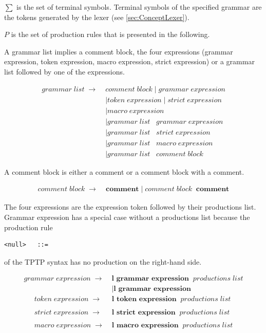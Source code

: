 $\sum$ is the set of terminal symbols. Terminal symbols of the specified grammar are the tokens generated by the lexer (see \ref{sec:ConceptLexer}).

$P$ is the set of production rules that is presented in the following. 

A grammar list implies a comment block, the four expressions (grammar expression, token expression, macro expression, strict expression) or a grammar list followed by one of the expressions.

\begin{align*}
	grammar\;list\; \rightarrow\; &comment\;block
	     		\mid grammar\;expression  \\
			   &\mid token\;expression
                \mid strict\;expression\\
               &\mid macro\;expression \\
               &\mid grammar\;list\;\;\;grammar\;expression\\
               &\mid grammar\;list\;\;\;strict\;expression \\
               &\mid grammar\;list\;\;\;macro\;expression \\
               &\mid grammar\;list\;\;\;comment\;block               
\end{align*}

A comment block is either a comment or a comment block with a comment.

\begin{align*}
    comment\;block\; \rightarrow\; &\textbf{comment}
                \mid comment\;block\;\;\textbf{comment}
\end{align*}

The four expressions are the expression token followed by their productions list. Grammar expression has a special case without a productions list because the production rule
\begin{verbatim}
<null>   ::= 
\end{verbatim} of the \ac{TPTP} syntax has no production on the right-hand side. 

\begin{align*}
	grammar\;expression\; \rightarrow\; &\textbf{l grammar expression}\;\;productions\;list \\ 
               &\mid \textbf{l grammar expression} 
\end{align*}
\begin{align*}        
	token\;expression\; \rightarrow\; &\textbf{l token expression} \;\;productions\;list \\ \\
	strict\;expression\; \rightarrow\; &\textbf{l strict expression} \;\;productions\;list \\ \\
	macro\;expression\; \rightarrow\; &\textbf{l macro expression} \;\;productions\;list 
\end{align*}

